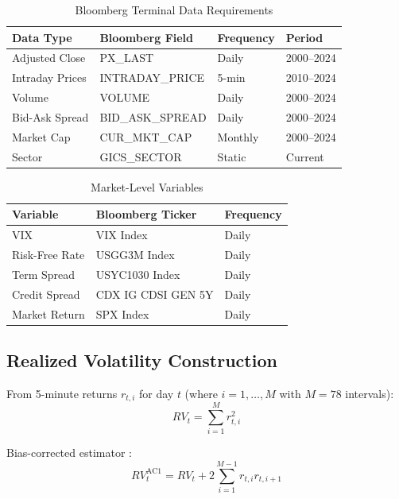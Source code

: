 \documentclass[11pt,a4paper]{article}
\theoremstyle{definition}
\begin{document}
\begin{table}[htbp]
\centering
\caption{Bloomberg Terminal Data Requirements}
\begin{tabular}{@{}llll@{}}
\toprule
\textbf{Data Type} & \textbf{Bloomberg Field} & \textbf{Frequency} & \textbf{Period} \\
\midrule
Adjusted Close & PX\_LAST & Daily & 2000--2024 \\
Intraday Prices & INTRADAY\_PRICE & 5-min & 2010--2024 \\
Volume & VOLUME & Daily & 2000--2024 \\
Bid-Ask Spread & BID\_ASK\_SPREAD & Daily & 2000--2024 \\
Market Cap & CUR\_MKT\_CAP & Monthly & 2000--2024 \\
Sector & GICS\_SECTOR & Static & Current \\
\bottomrule
\end{tabular}
\end{table}

\begin{table}[htbp]
\centering
\caption{Market-Level Variables}
\begin{tabular}{@{}lll@{}}
\toprule
\textbf{Variable} & \textbf{Bloomberg Ticker} & \textbf{Frequency} \\
\midrule
VIX & VIX Index & Daily \\
Risk-Free Rate & USGG3M Index & Daily \\
Term Spread & USYC1030 Index & Daily \\
Credit Spread & CDX IG CDSI GEN 5Y & Daily \\
Market Return & SPX Index & Daily \\
\bottomrule
\end{tabular}
\end{table}

\subsection{Realized Volatility Construction}

From 5-minute returns $r_{t,i}$ for day $t$ (where $i = 1, \ldots, M$ with $M = 78$ intervals):
\begin{equation}
    RV_t = \sum_{i=1}^{M} r_{t,i}^2
\end{equation}

Bias-corrected estimator \citep{hansen2006realized}:
\begin{equation}
    RV_t^{\text{AC1}} = RV_t + 2\sum_{i=1}^{M-1} r_{t,i} r_{t,i+1}
\end{equation}
\end{document}

